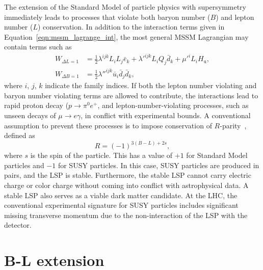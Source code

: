 The extension of the Standard Model of particle physics with supersymmetry
immediately leads to processes that violate both baryon number ($B$) and
lepton number ($L$) conservation.
In addition to the interaction terms given in
Equation~\ref{eqn:mssm_lagrange_int}, the most general MSSM Lagrangian may
contain terms such as
\begin{align}
    W_{\Delta L = 1} & =
    \frac{1}{2} \lambda^{ijk} L_{i} L_{j} \bar{e}_{k} +
    \lambda'^{ijk} L_{i} Q_{j} \bar{d}_{k} +
    \mu'^{i} L_{i} H_\mathrm{u},
    \label{eqn:rpv_terms_1}
    \\
    W_{\Delta B = 1} & =
    \frac{1}{2} \lambda''^{ijk} \bar{u}_{i} \bar{d}_{j} \bar{d}_{k},
    \label{eqn:rpv_terms_2}
\end{align}
where $i$, $j$, $k$ indicate the family indices.
If both the lepton number violating and baryon number violating terms are
allowed to contribute, the interactions lead to rapid proton decay
($p \to \pi^{0} e^{+}$, and lepton-number-violating processes, such
as unseen decays of $\mu \to e\gamma$, in conflict with experimental bounds.
A conventional assumption to prevent these processes is to impose
conservation of $R$-parity~\cite{Fayet:1976et,Fayet:1977yc,Farrar:1978xj,
Fayet:1979sa,Dimopoulos:1981zb},
defined as
\begin{equation}
  R=(-1)^{3(B-L)+2s},
\end{equation}
where $s$ is the spin of the particle.
This has a value of $+1$ for Standard Model particles and $-1$ for
SUSY particles.
In this case, SUSY particles are produced in pairs, and the LSP is stable.
Furthermore, the stable LSP cannot carry electric charge or color charge
without coming into conflict with astrophysical data.
A stable LSP also serves as a viable dark matter candidate.
At the LHC, the conventional experimental signature for SUSY particles
includes significant missing transverse momentum due to the non-interaction of
the LSP with the detector.

\section{B-L extension}
\label{sec:theory_bl_extension}

